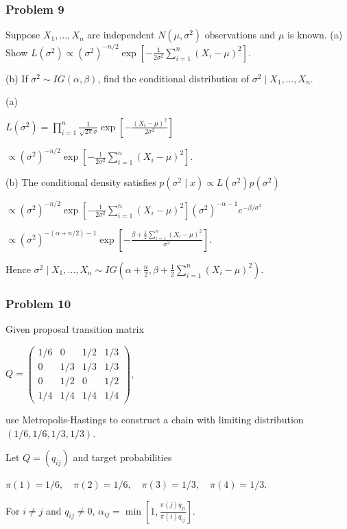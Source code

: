 \subsubsection*{Problem 9}

 Suppose $X_1,\ldots,X_n$ are independent $N(\mu,\sigma^2)$ observations and $\mu$ is known. (a) Show
$L(\sigma^2)\propto(\sigma^2)^{-n/2}\exp\left[-\frac1{2\sigma^2}\sum_{i=1}^n(X_i-\mu)^2\right].$

(b) If $\sigma^2\sim IG(\alpha,\beta)$, find the conditional distribution of $\sigma^2\mid X_1,\ldots,X_n$.

 (a)

$L(\sigma^2)=\prod_{i=1}^n\frac1{\sqrt{2\pi}\sigma}\exp\left[-\frac{(X_i-\mu)^2}{2\sigma^2}\right]$

$\propto(\sigma^2)^{-n/2}\exp\left[-\frac1{2\sigma^2}\sum_{i=1}^n(X_i-\mu)^2\right].$

(b) The conditional density satisfies
$p(\sigma^2\mid x)\propto L(\sigma^2)p(\sigma^2)$

$\propto(\sigma^2)^{-n/2}\exp\left[-\frac1{2\sigma^2}\sum_{i=1}^n(X_i-\mu)^2\right](\sigma^2)^{-\alpha-1}e^{-\beta/\sigma^2}$

$\propto(\sigma^2)^{-(\alpha+n/2)-1}\exp\left[-\frac{\beta+\frac12\sum_{i=1}^n(X_i-\mu)^2}{\sigma^2}\right].$

Hence
$\sigma^2\mid X_1,\ldots,X_n\sim IG\left(\alpha+\frac n2,\beta+\frac12\sum_{i=1}^n(X_i-\mu)^2\right)$.

\subsubsection*{Problem 10}

 Given proposal transition matrix

$Q=\begin{pmatrix}1/6&0&1/2&1/3\\0&1/3&1/3&1/3\\0&1/2&0&1/2\\1/4&1/4&1/4&1/4\end{pmatrix}$,

use Metropolis-Hastings to construct a chain with limiting distribution $(1/6,1/6,1/3,1/3)$.

 Let $Q=(q_{ij})$ and target probabilities

$\pi(1)=1/6,\quad\pi(2)=1/6,\quad\pi(3)=1/3,\quad\pi(4)=1/3$.

For $i\neq j$ and $q_{ij}\neq0$,
$\alpha_{ij}=\min\left[1,\frac{\pi(j)q_{ji}}{\pi(i)q_{ij}}\right].$


